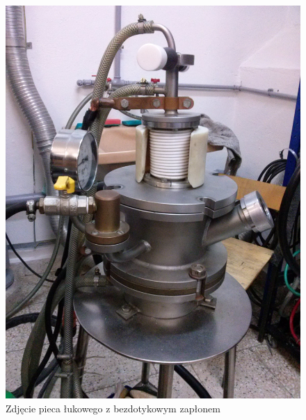 \documentclass[a4paper,12pt]{article}
\numberwithin{equation}{section}
\begin{document}
\newpage
\begin{figure}[h]
\centerline{\includegraphics[scale=0.1]{../img/piecfoto}}
\caption{Zdjęcie pieca łukowego z bezdotykowym zapłonem}
\label{fig:fotoPieca}
\end{figure}
 
\end{document}
